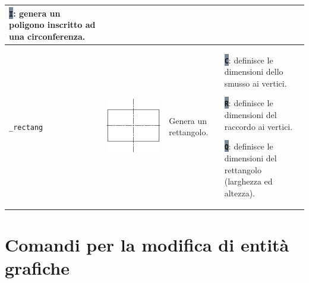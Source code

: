 \documentclass[..]{../IEEEphot}
\newcommand{\param}[1]{\colorbox{LightSlateGray}{\color{Navy}\texttt{\textbf{#1}}}}
\begin{document}
\begin{center}
\begin{longtable}{m{.1\linewidth}m{.2\linewidth}m{.3\linewidth}m{.3\linewidth}}
\param{I}: genera un poligono inscritto ad una circonferenza.  \\
\midrule
\texttt{\_rectang} & \includegraphics[width = 0.8\linewidth, keepaspectratio]{../images/jpg/_rectang.jpg} & Genera un rettangolo. & 
\param{C}: definisce le dimensioni dello smusso ai vertici.

\param{R}: definisce le dimensioni del raccordo ai vertici.

\param{Q}: definisce le dimensioni del rettangolo (larghezza ed altezza).

\\
\bottomrule
\end{longtable}
\end{center}

\clearpage

\section{Comandi per la modifica di entità grafiche}
\end{document}

